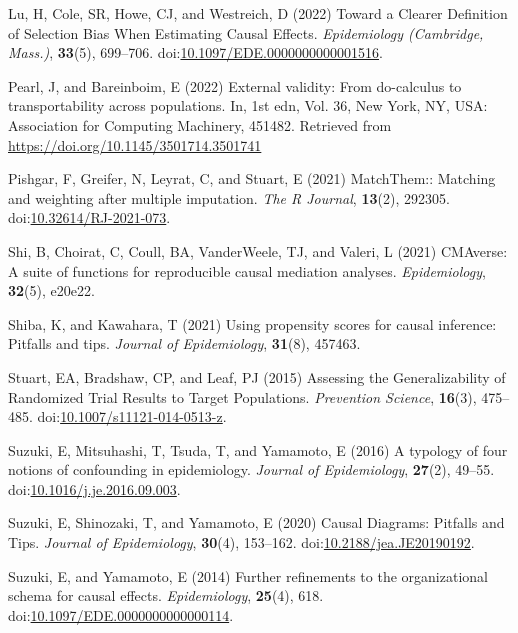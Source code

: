 \documentclass[
  singlecolumn,
  9pt]{article}
\newlength{\cslhangindent}
\newenvironment{CSLReferences}[2] %
 {\begin{list}{}{%
  \setlength{\itemindent}{0pt}
  \setlength{\leftmargin}{0pt}
  \setlength{\parsep}{0pt}
  \ifodd #1
   \setlength{\leftmargin}{\cslhangindent}
   \setlength{\itemindent}{-1\cslhangindent}
  \fi
  \setlength{\itemsep}{#2\baselineskip}}}
 {\end{list}}
\begin{document}
\begin{CSLReferences}{1}{0}
Lu, H, Cole, SR, Howe, CJ, and Westreich, D (2022) Toward a Clearer
Definition of Selection Bias When Estimating Causal Effects.
\emph{Epidemiology (Cambridge, Mass.)}, \textbf{33}(5), 699--706.
doi:\href{https://doi.org/10.1097/EDE.0000000000001516}{10.1097/EDE.0000000000001516}.

Pearl, J, and Bareinboim, E (2022) External validity: From do-calculus
to transportability across populations. In, 1st edn, Vol. 36, New York,
NY, USA: Association for Computing Machinery, 451482. Retrieved from
\url{https://doi.org/10.1145/3501714.3501741}

Pishgar, F, Greifer, N, Leyrat, C, and Stuart, E (2021) MatchThem::
Matching and weighting after multiple imputation. \emph{The R Journal},
\textbf{13}(2), 292305.
doi:\href{https://doi.org/10.32614/RJ-2021-073}{10.32614/RJ-2021-073}.

Shi, B, Choirat, C, Coull, BA, VanderWeele, TJ, and Valeri, L (2021)
CMAverse: A suite of functions for reproducible causal mediation
analyses. \emph{Epidemiology}, \textbf{32}(5), e20e22.

Shiba, K, and Kawahara, T (2021) Using propensity scores for causal
inference: Pitfalls and tips. \emph{Journal of Epidemiology},
\textbf{31}(8), 457463.

Stuart, EA, Bradshaw, CP, and Leaf, PJ (2015) Assessing the
Generalizability of Randomized Trial Results to Target Populations.
\emph{Prevention Science}, \textbf{16}(3), 475--485.
doi:\href{https://doi.org/10.1007/s11121-014-0513-z}{10.1007/s11121-014-0513-z}.

Suzuki, E, Mitsuhashi, T, Tsuda, T, and Yamamoto, E (2016) A typology of
four notions of confounding in epidemiology. \emph{Journal of
Epidemiology}, \textbf{27}(2), 49--55.
doi:\href{https://doi.org/10.1016/j.je.2016.09.003}{10.1016/j.je.2016.09.003}.

Suzuki, E, Shinozaki, T, and Yamamoto, E (2020) Causal Diagrams:
Pitfalls and Tips. \emph{Journal of Epidemiology}, \textbf{30}(4),
153--162.
doi:\href{https://doi.org/10.2188/jea.JE20190192}{10.2188/jea.JE20190192}.

Suzuki, E, and Yamamoto, E (2014) Further refinements to the
organizational schema for causal effects. \emph{Epidemiology},
\textbf{25}(4), 618.
doi:\href{https://doi.org/10.1097/EDE.0000000000000114}{10.1097/EDE.0000000000000114}.


\end{CSLReferences}
\end{document}
